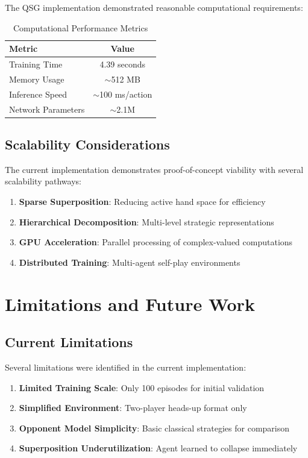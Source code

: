 \documentclass[11pt,a4paper]{article}
\begin{document}
The QSG implementation demonstrated reasonable computational requirements:

\begin{table}[h]
\centering
\begin{tabular}{@{}lc@{}}
\toprule
\textbf{Metric} & \textbf{Value} \\
\midrule
Training Time & 4.39 seconds \\
Memory Usage & $\sim$512 MB \\
Inference Speed & $\sim$100 ms/action \\
Network Parameters & $\sim$2.1M \\
\bottomrule
\end{tabular}
\caption{Computational Performance Metrics}
\label{tab:computational_metrics}
\end{table}

\subsection{Scalability Considerations}

The current implementation demonstrates proof-of-concept viability with several scalability pathways:

\begin{enumerate}
\item \textbf{Sparse Superposition}: Reducing active hand space for efficiency
\item \textbf{Hierarchical Decomposition}: Multi-level strategic representations
\item \textbf{GPU Acceleration}: Parallel processing of complex-valued computations
\item \textbf{Distributed Training}: Multi-agent self-play environments
\end{enumerate}

\section{Limitations and Future Work}

\subsection{Current Limitations}

Several limitations were identified in the current implementation:

\begin{enumerate}
\item \textbf{Limited Training Scale}: Only 100 episodes for initial validation
\item \textbf{Simplified Environment}: Two-player heads-up format only
\item \textbf{Opponent Model Simplicity}: Basic classical strategies for comparison
\item \textbf{Superposition Underutilization}: Agent learned to collapse immediately
\end{enumerate}
\end{document}
